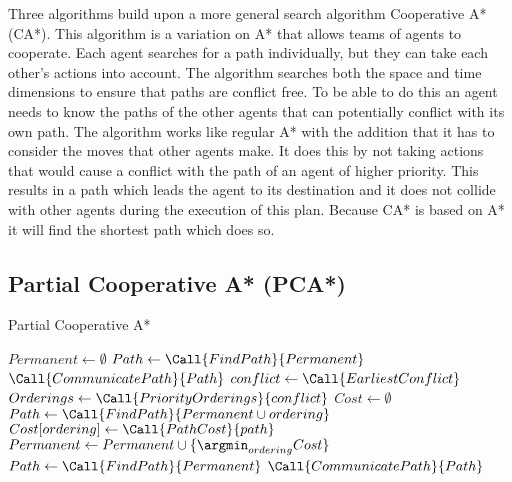 Three algorithms build upon a more general search algorithm
Cooperative A* (CA*). This algorithm is a variation on A* \cite{hart1968} that
allows teams of agents to cooperate. Each agent searches for a path
individually, but they can take each other's actions into account. The
algorithm searches both the space and time dimensions to ensure that paths are
conflict free. To be able to do this an agent needs to know the paths of the
other agents that can potentially conflict with its own path. The algorithm
works like regular A* with the addition that it has to consider the moves that
other agents make. It does this by not taking actions that would cause a
conflict
with the path of an agent of higher priority. This results in a path which
leads the agent to its destination and it does not collide with other agents
during the execution of this plan. Because CA* is based on A* it will find the
shortest path which does so.

\subsection{Partial Cooperative A* (PCA*)}

\begin{algorithm}[t]
    \caption{Partial Cooperative A*}
    \label{alg:pca}
    \begin{algorithmic}[1]
        \State $Permanent \gets \emptyset$
        \State $Path \gets \Call{FindPath}{Permanent}$
        \State $\Call{CommunicatePath}{Path}$
        \State $conflict \gets \Call{EarliestConflict}$
        \State $Orderings \gets \Call{PriorityOrderings}{conflict}$ 
        \State $Cost \gets \emptyset$
        \State $Path \gets \Call{FindPath}{Permanent \cup ordering}$
        \State $Cost[ordering] \gets \Call{PathCost}{path}$
        \EndFor
        \State $Permanent \gets Permanent \cup \{ \argmin_{ordering}{Cost} \}$
        \State $Path \gets \Call{FindPath}{Permanent}$
        \State $\Call{CommunicatePath}{Path}$
        \EndWhile
    \end{algorithmic}
\end{algorithm}

